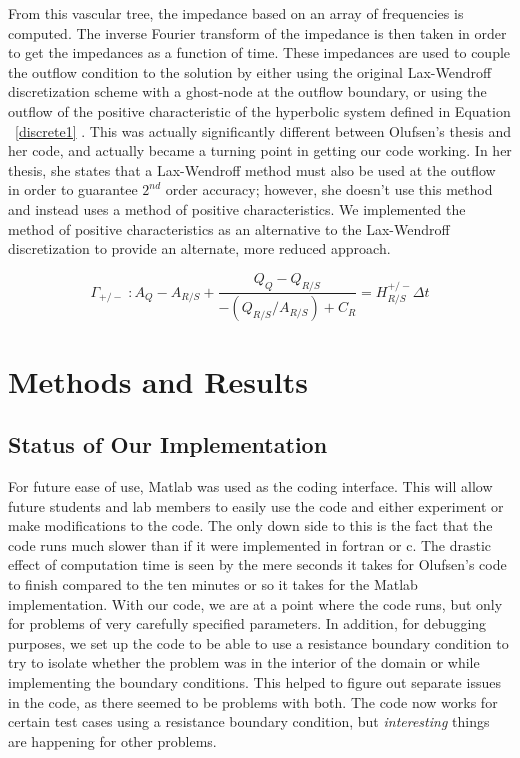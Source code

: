 \documentclass[12pt]{article}
\begin{document}
From this vascular tree, the impedance based on an array of frequencies is computed. The inverse Fourier transform of the impedance is then taken in order to get the impedances as a function of time. These impedances are used to couple the outflow condition to the solution by either using the original Lax-Wendroff discretization scheme with a ghost-node at the outflow boundary, or using the outflow of the positive characteristic of the hyperbolic system defined in Equation ~\eqref{discrete1} . This was actually significantly different between Olufsen's thesis and her code, and actually became a turning point in getting our code working. In her thesis, she states that a Lax-Wendroff method must also be used at the outflow in order to guarantee $2^{nd}$ order accuracy; however, she doesn't use this method and instead uses a method of positive characteristics. We implemented the method of positive characteristics as an alternative to the Lax-Wendroff discretization to provide an alternate, more reduced approach.

 \begin{equation}
 	\label{characteristics}
 	\Gamma_{+/-}\; : A_Q - A_{R/S} + \frac{Q_Q - Q_{R/S}}{-(Q_{R/S}/A_{R/S}) + C_R} = H_{R/S}^{+/-} \Delta t
\end{equation}

\section{Methods and Results}
\subsection{Status of Our Implementation}
For future ease of use, Matlab was used as the coding interface. This will allow future students and lab members to easily use the code and either experiment or make modifications to the code. The only down side to this is the fact that the code runs much slower than if it were implemented in fortran or c. The drastic effect of computation time is seen by the mere seconds it takes for Olufsen's code to finish compared to the ten minutes or so it takes for the Matlab implementation. With our code, we are at a point where the code runs, but only for problems of very carefully specified parameters. In addition, for debugging purposes, we set up the code to be able to use a resistance boundary condition to try to isolate whether the problem was in the interior of the domain or while implementing the boundary conditions. This helped to figure out separate issues in the code, as there seemed to be problems with both. The code now works for certain test cases using a resistance boundary condition, but \textit{interesting} things are happening for other problems.\\
\end{document}
